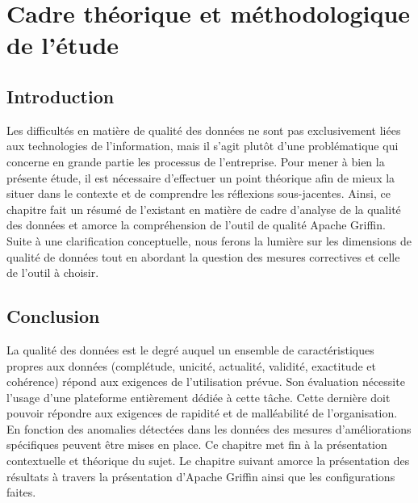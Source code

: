 \chapter{Cadre th\'eorique et m\'ethodologique de l'\'etude}
\section*{Introduction}
Les difficult\'es en mati\`ere de qualité des données ne sont pas exclusivement liées aux technologies de l'information, mais il s’agit plutôt d’une problématique qui concerne en grande partie les processus de l’entreprise. Pour mener à bien la présente étude, il est nécessaire d’effectuer un point th\'eorique afin de mieux la situer dans le contexte et de comprendre les r\'eflexions sous-jacentes. Ainsi, ce chapitre fait un résumé de l’existant en matière de cadre d'analyse de la qualit\'e des donn\'ees et amorce la compr\'ehension de l'outil de qualit\'e Apache Griffin. Suite \`a une clarification conceptuelle, nous ferons la lumi\`ere sur les dimensions de qualit\'e de donn\'ees tout en abordant la question des mesures correctives et celle de l'outil \`a choisir.



\section*{Conclusion}
La qualit\'e des donn\'ees est le degr\'e auquel un ensemble de caract\'eristiques propres aux donn\'ees (complétude, unicité, actualit\'e, validit\'e, exactitude et coh\'erence) répond aux exigences de l'utilisation pr\'evue. Son \'evaluation nécessite l'usage d'une plateforme entièrement d\'edi\'ee   \`a cette  tâche. Cette derni\`ere doit pouvoir r\'epondre aux exigences de rapidit\'e et de mall\'eabilit\'e de l'organisation. En fonction des anomalies d\'etect\'ees dans les donn\'ees des mesures d'am\'eliorations sp\'ecifiques peuvent \^etre mises en place. Ce chapitre met fin \`a la pr\'esentation contextuelle et  th\'eorique du sujet. Le chapitre suivant amorce la pr\'esentation des r\'esultats \`a travers la présentation d'Apache Griffin ainsi que les configurations faites.
